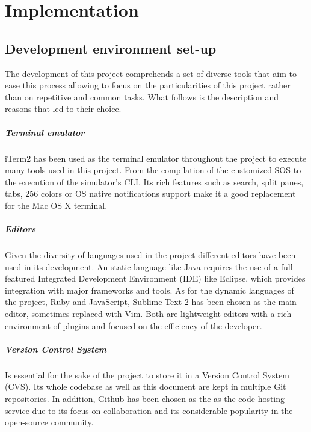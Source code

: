 \chapter{Implementation}

\section{Development environment set-up}

The development of this project comprehends a set of diverse tools that aim to ease this process allowing to focus on the particularities of this project rather than on repetitive and common tasks. What follows is the description and reasons that led to their choice.

\paragraph{Terminal emulator} iTerm2 has been used as the terminal emulator throughout the project to execute many tools used in this project. From the compilation of the customized SOS to the execution of the simulator's CLI. Its rich features such as search, split panes, tabs, 256 colors or OS native notifications support make it a good replacement for the Mac OS X terminal.

\paragraph{Editors} Given the diversity of languages used in the project different editors have been used in its development. An static language like Java requires the use of a full-featured Integrated Development Environment (IDE) like Eclipse, which provides integration with major frameworks and tools. As for the dynamic languages of the project, Ruby and JavaScript, Sublime Text 2 has been chosen as the main editor, sometimes replaced with Vim. Both are lightweight editors with a rich environment of plugins and focused on the efficiency of the developer.

\paragraph{Version Control System} Is essential for the sake of the project to store it in a Version Control System (CVS). Its whole codebase as well as this document are kept in multiple Git repositories. In addition, Github has been chosen as the as the code hosting service due to its focus on collaboration and its considerable popularity in the open-source community.
	
